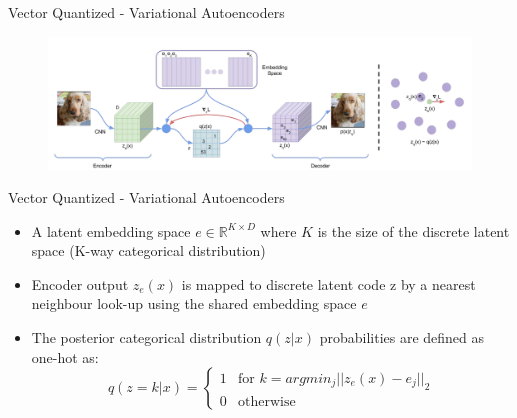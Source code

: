 \begin{frame}[allowframebreaks]{Vector Quantized - Variational Autoencoders}
\begin{figure}
        \centering
        \includegraphics[height=0.9\textheight, width=\textwidth, keepaspectratio]{images/vae/vqvae.PNG}
\end{figure}
\end{frame}

\begin{frame}[allowframebreaks]{Vector Quantized - Variational Autoencoders}

\begin{itemize}
    \item A latent embedding space $e \in \mathbb{R}^{K \times D}$ where $K$ is the size of the discrete latent space (K-way categorical distribution)
    \item  Encoder output $z_e(x)$ is mapped to discrete latent code z by a nearest neighbour look-up using the shared embedding space $e$
    \item The posterior categorical distribution $q(z|x)$ probabilities are defined as one-hot as:
    \[ q(z = k|x) = \begin{cases} 
          1 & \text{for } k = argmin_j ||z_e(x) - e_j||_2 \\
          0 & \text{otherwise}
       \end{cases}
    \]
\end{itemize}
\end{frame}

